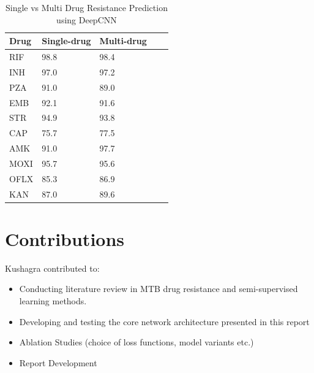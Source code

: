 \documentclass{article}
\begin{document}
\begin{table}
    \centering
    \caption{Single vs Multi Drug Resistance Prediction using DeepCNN}
    \begin{tabular}{lllll}
        \toprule
        \multirow{1}{*}[0em]{Drug} & Single-drug & Multi-drug\\
        \midrule
        RIF & 98.8 & 98.4\\
        INH & 97.0 & 97.2\\
        PZA & 91.0 & 89.0\\
        EMB & 92.1 & 91.6\\
        STR & 94.9 & 93.8\\
        CAP & 75.7 & 77.5\\
        AMK & 91.0 & 97.7\\
        MOXI & 95.7 & 95.6\\
        OFLX & 85.3 & 86.9\\
        KAN & 87.0 & 89.6\\
        \bottomrule
    \end{tabular}
    \label{table:sm}
  \end{table}

\section{Contributions}
Kushagra contributed to:
\begin{itemize}
  \item Conducting literature review in MTB drug resistance and semi-supervised
  learning methods.
  \item Developing and testing the core network architecture presented in this report
  \item Ablation Studies (choice of loss functions, model variants etc.)
  \item Report Development
\end{itemize}


\end{document}
